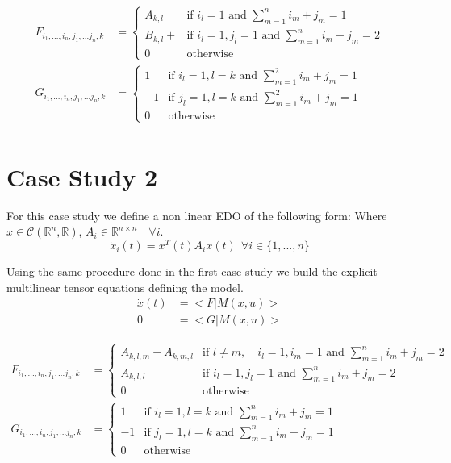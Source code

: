 \documentclass{article}
\begin{document}
{\begin{align}
    F_{i_1, ..., i_n, j_1, ...j_n, k} &= \left\{
        \begin{array}{ll}
            A_{k,l} & \text{if } i_l = 1 \text{ and } \sum_{m= 1}^n i_m + j_m = 1 \\
            B_{k,l} +  & \text{if } i_l = 1, j_l = 1 \text{ and } \sum_{m= 1}^n i_m + j_m = 2 \\
            0 & \text{otherwise} 
        \end{array}
    \right.\\
    G_{i_1, ..., i_n, j_1, ...j_n, k} &= \left\{
        \begin{array}{ll}
            1 & \text{if } i_l = 1, l=k \text{ and } \sum_{m= 1}^2 i_m + j_m = 1 \\
            -1 & \text{if } j_l = 1, l=k \text{ and } \sum_{m= 1}^2 i_m + j_m = 1 \\
            0 & \text{otherwise} 
        \end{array}
    \right.\\
\end{align}

\section{Case Study 2}

For this case study we define a non linear EDO of the following form:
Where $x \in \mathcal{C}(\mathbb{R}^n, \mathbb{R})$, $A_i \in \mathbb{R}^{n \times n } \quad \forall i$.
\begin{equation}
    \dot{x}_i(t) = x^T(t) A_i x(t) \ \ \forall i \in \{1,...,n\} 
\end{equation}

Using the same procedure done in the first case study we build the explicit multilinear tensor equations defining the model.
\begin{align}
    \dot{x}(t) &= <F|M(x,u)> \\
    0 &= <G|M(x,u)>
\end{align}

\begin{align}
    F_{i_1, ..., i_n, j_1, ...j_n, k} &= \left\{
        \begin{array}{ll}
            A_{k,l,m} + A_{k,m,l} & \text{if } l \neq m, \quad i_l = 1, i_m = 1 \text{ and } \sum_{m= 1}^n i_m + j_m = 2 \\
            A_{k,l,l} & \text{if } i_l = 1, j_l = 1 \text{ and } \sum_{m= 1}^n i_m + j_m = 2 \\
            0 & \text{otherwise} 
        \end{array}
    \right.\\
    G_{i_1, ..., i_n, j_1, ...j_n, k} &= \left\{
        \begin{array}{ll}
            1 & \text{if } i_l = 1, l=k \text{ and } \sum_{m= 1}^n i_m + j_m = 1 \\
            -1 & \text{if } j_l = 1, l=k \text{ and } \sum_{m= 1}^n i_m + j_m = 1 \\
            0 & \text{otherwise} 
        \end{array}
    \right.\\
\end{align}

}
\end{document}

